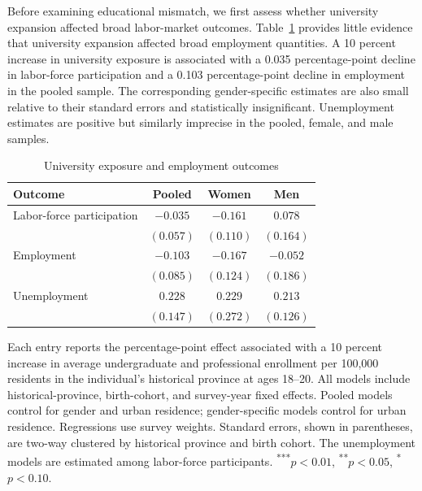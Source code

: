 Before examining educational mismatch, we first assess whether university expansion affected broad labor-market outcomes. Table~\ref{tab:employment} provides little evidence that university expansion affected broad employment quantities. A 10 percent increase in university exposure is associated with a 0.035 percentage-point decline in labor-force participation and a 0.103 percentage-point decline in employment in the pooled sample. The corresponding gender-specific estimates are also small relative to their standard errors and statistically insignificant. Unemployment estimates are positive but similarly imprecise in the pooled, female, and male samples.

\begin{table}[htbp]
  \centering
  \caption{University exposure and employment outcomes}
  \label{tab:employment}
  \begin{threeparttable}
  \begin{tabular}{lccc}
    \toprule
    Outcome & Pooled & Women & Men \\
    \midrule
    Labor-force participation & $-0.035$  & $-0.161$  & $0.078$  \\
                              & $(0.057)$ & $(0.110)$ & $(0.164)$ \\
    Employment                & $-0.103$  & $-0.167$  & $-0.052$ \\
                              & $(0.085)$ & $(0.124)$ & $(0.186)$ \\
    Unemployment              & $0.228$   & $0.229$   & $0.213$  \\
                              & $(0.147)$ & $(0.272)$ & $(0.126)$ \\
    \bottomrule
  \end{tabular}
  \begin{tablenotes}[flushleft]
    \footnotesize
    \item Each entry reports the percentage-point effect associated with a 10 percent increase in average undergraduate and professional enrollment per 100,000 residents in the individual's historical province at ages 18--20. All models include historical-province, birth-cohort, and survey-year fixed effects. Pooled models control for gender and urban residence; gender-specific models control for urban residence. Regressions use survey weights. Standard errors, shown in parentheses, are two-way clustered by historical province and birth cohort. The unemployment models are estimated among labor-force participants. \textsuperscript{***}$p<0.01$, \textsuperscript{**}$p<0.05$, \textsuperscript{*}$p<0.10$.
  \end{tablenotes}
  \end{threeparttable}
\end{table}


